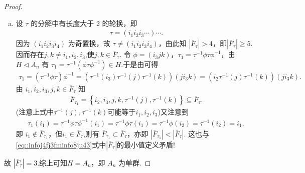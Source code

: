 \documentclass[../../main.tex]{subfiles}%
\begin{document}
\begin{proof}
\begin{enumerate}[(a)]
若 \( j \in \bar{F}_\tau \)，则$\tau =(i_1i_2)\left( i_3i_4 \right) \cdots \left( j\tau ^{-1}\left( j \right) \right) \cdots $且$i_1,i_2,i_3,i_4,j,\tau ^{-1}\left( j \right) $互不相同.由 \( j \neq i_1, i_2, i_3, i_4 \)知$|\bar{F}_\tau| \geqslant 5$,又$\tau$可写成对换之积,故$|\bar{F}_\tau|$必为偶数,因此 \( |\bar{F}_\tau| \geqslant 6 \). 此时由可得
\begin{align*}
(i_4i_3\tau ^{-1}(j))(i_4i_3j)=\left( i_4\tau ^{-1}\left( j \right) \right) \left( i_4i_3 \right) \left( i_4i_3j \right) =\left( i_4\tau ^{-1}\left( j \right) \right) \left( i_4 \right) \left( i_3j \right) =\left( i_4\tau ^{-1}\left( j \right) \right) \left( i_3j \right) .
\end{align*}
于是
\begin{align*}
|\bar{F}_{\tau_1}| = |\{i_3, i_4, j, \tau^{-1}(j)\}| = 4 < |\bar{F}_\tau|.
\end{align*}
这也\eqref{eq::infoj4fj3fminfo8ju43}式中$|\bar{F}_\tau|$的最小值定义矛盾! 因而 \( \tau = (i_1i_2)(i_3i_4)\cdots \) 是不可能的.
\item 设 \( \tau \) 的分解中有长度大于 2 的轮换，即
\begin{align*}
\tau = (i_1i_2i_3\cdots)\cdots.
\end{align*}
因为 \( (i_1i_2i_3i_4) \) 为奇置换，故 \( \tau \neq (i_1i_2i_3i_4) \)，由此知 \( |\bar{F}_\tau| > 4 \)，即$|\bar{F}_\tau|\geqslant 5$.因而存在\( j, k\neq i_1,i_2,i_3\),使\(j,k \in \bar{F}_\tau \). 令 \( \phi = (i_3jk) \)，\( \tau_1 = \tau^{-1}\phi\tau\phi^{-1} \)，由 \( H \lhd A_n \) 有 \( \tau_1 = \tau^{-1}(\phi\tau\phi^{-1}) \in H \).于是由可得
\begin{align*}
\tau _1=(\tau ^{-1}\phi \tau )\phi ^{-1}=(\tau ^{-1}(i_3)\tau ^{-1}(j)\tau ^{-1}(k))(ji_3k)=(i_2\tau ^{-1}(j)\tau ^{-1}(k))(ji_3k).
\end{align*}
由 \(i_1,i_2,i_3, j, k \in \bar{F}_\tau \) 知
\begin{align*}
\bar{F}_{\tau _1} = \left\{ i_2,i_3,j,k,\tau ^{-1}(j),\tau ^{-1}(k) \right\} \subseteq \bar{F}_{\tau}.
\end{align*}
(注意上式中$\tau^{-1}(j),\tau^{-1}(k)$可能等于$i_1,i_2,i_3$)又注意到
\begin{align*}
\tau _1(i_1)=\tau ^{-1}\phi \tau \phi ^{-1}(i_1)=\tau ^{-1}\phi \tau (i_1)=\tau ^{-1}\phi (i_2)=\tau ^{-1}(i_2)=i_1,
\end{align*}
即 \( i_1 \notin \bar{F}_{\tau_1} \)，但$i_1\in \bar{F}_{\tau}$,则有 \( \bar{F}_{\tau_1} \subset \bar{F}_\tau \)，亦即 \( |\bar{F}_{\tau_1}| < |\bar{F}_\tau| \). 这也与\eqref{eq::infoj4fj3fminfo8ju43}式中$|\bar{F}_\tau|$的最小值定义矛盾! 
\end{enumerate}
故 \( |\bar{F}_\tau| = 3 \).综上可知\( H = A_n \)，即 \( A_n \) 为单群.
\end{proof}
\end{document}
